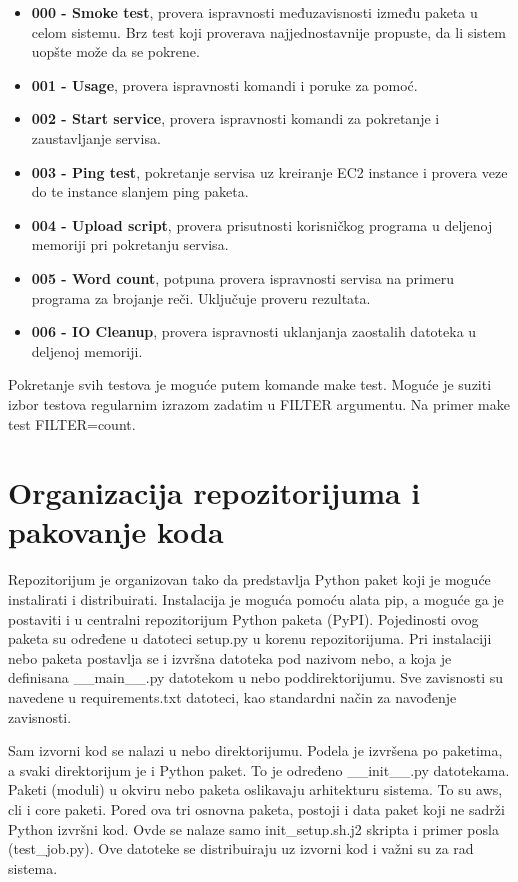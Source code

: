 \documentclass[a4paper]{article}
\begin{document}
\begin{itemize}
\item {\bf 000 - Smoke test}, provera ispravnosti međuzavisnosti između paketa u
  celom sistemu. Brz test koji proverava najjednostavnije propuste, da li sistem uopšte
  može da se pokrene.
  \item {\bf 001 - Usage}, provera ispravnosti komandi i poruke za pomoć.
  \item {\bf 002 - Start service}, provera ispravnosti komandi za pokretanje i
    zaustavljanje servisa.
  \item {\bf 003 - Ping test}, pokretanje servisa uz kreiranje EC2 instance i
    provera veze do te instance slanjem ping paketa.
  \item {\bf 004 - Upload script}, provera prisutnosti korisničkog programa u
    deljenoj memoriji pri pokretanju servisa.
  \item {\bf 005 - Word count}, potpuna provera ispravnosti servisa na primeru
    programa za brojanje reči. Uključuje proveru rezultata.
  \item {\bf 006 - IO Cleanup}, provera ispravnosti uklanjanja zaostalih
    datoteka u deljenoj memoriji.
\end{itemize}

Pokretanje svih testova je moguće putem komande make test. Moguće je suziti
izbor testova regularnim izrazom zadatim u FILTER argumentu. Na primer make test FILTER=count.

\section{Organizacija repozitorijuma i pakovanje koda}

Repozitorijum je organizovan tako da predstavlja Python paket koji je moguće
instalirati i distribuirati. Instalacija je moguća pomoću alata pip, a moguće ga
je postaviti i u centralni repozitorijum Python paketa (PyPI). Pojedinosti ovog
paketa su određene u datoteci setup.py u korenu repozitorijuma. Pri instalaciji
nebo paketa postavlja se i izvršna datoteka pod nazivom nebo, a koja je
definisana \_\_main\_\_.py datotekom u nebo poddirektorijumu. Sve zavisnosti su
navedene u requirements.txt datoteci, kao standardni način za navođenje zavisnosti.

Sam izvorni kod se nalazi u nebo direktorijumu. Podela je izvršena po paketima,
a svaki direktorijum je i Python paket. To je određeno \_\_init\_\_.py datotekama.
Paketi (moduli) u okviru nebo paketa oslikavaju arhitekturu sistema. To su aws,
cli i core paketi. Pored ova tri osnovna paketa, postoji i data paket koji ne
sadrži Python izvršni kod. Ovde se nalaze samo init\_setup.sh.j2 skripta i primer
posla (test\_job.py). Ove datoteke se distribuiraju uz izvorni kod i važni su za
rad sistema. 
\end{document}
